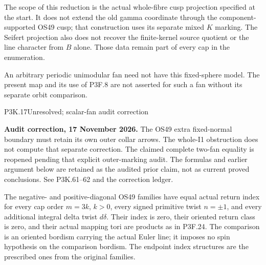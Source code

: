 The scope of this reduction is the actual whole-fibre cusp
projection specified at the start.  It does not extend the old
gamma coordinate through the component-supported OS49 cusp;
that construction uses its separate mixed \(K\) marking.
The Seifert projection also does not recover the finite-kernel
source quotient or the line character from \(B\) alone.
Those data remain part of every cap in the enumeration.

An arbitrary periodic unimodular fan need not have this fixed-sphere
model.  The present map and its use of P3F.8 are not asserted for
such a fan without its separate orbit comparison.

\begin{statement}{P3K.17}{Unresolved; scalar-fan audit correction}
\par\noindent\textbf{Audit correction, 17 November 2026.} The OS49 extra fixed-normal boundary must retain its own outer collar arrows. The whole-I1 obstruction does not compute that separate correction. The claimed complete two-fan equality is reopened pending that explicit outer-marking audit. The formulas and earlier argument below are retained as the audited prior claim, not as current proved conclusions. See P3K.61--62 and the correction ledger.
\medskip

The negative- and positive-diagonal OS49 families have equal
actual return index for every cap order \(m=3k\),
\(k>0\), every signed primitive twist \(n=\pm1\),
and every additional integral delta twist \(d\delta\).
Their index is zero, their oriented return class is zero, and
their actual mapping tori are products as in P3F.24.
The comparison is an oriented bordism carrying the actual
Euler line; it imposes no spin hypothesis on the comparison
bordism.  The endpoint index structures are the prescribed
ones from the original families.
\end{statement}

